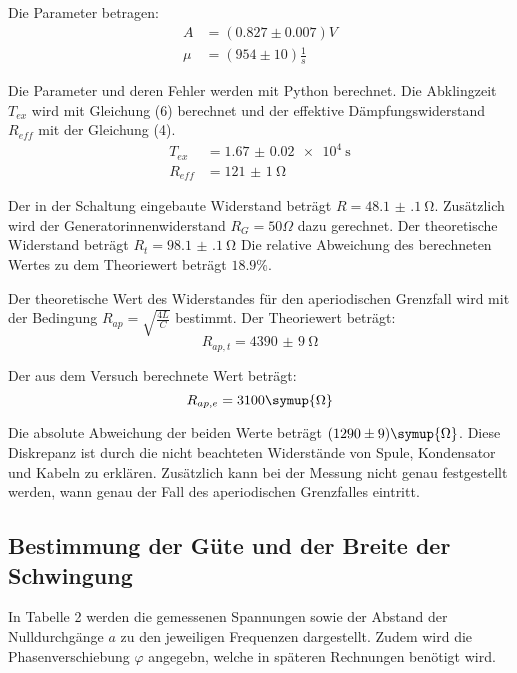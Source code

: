 Die Parameter betragen:
\begin{align*}
  A &= (0.827 \pm 0.007)V \\
  \mu &= (954 \pm 10)\frac{1}{s}
\end{align*}

Die Parameter und deren Fehler werden mit Python berechnet.
Die Abklingzeit $T_{ex}$ wird mit Gleichung (6) berechnet und der effektive Dämpfungswiderstand $R_{eff}$ mit
der Gleichung (4).
\begin{align*}
T_{ex} &= \SI{1.67(2)e4}{\second} \\
R_{eff} &= \SI{121(1)}{\ohm}
\end{align*}

Der in der Schaltung eingebaute Widerstand beträgt $R = \SI{48.1(1)}{\ohm}$. Zusätzlich wird der
Generatorinnenwiderstand $R_G = 50 \Omega$ dazu gerechnet. Der theoretische Widerstand beträgt $R_t = \SI{98.1(1)}{\ohm}$
Die relative Abweichung des berechneten Wertes zu dem Theoriewert beträgt $18.9\%$.


Der theoretische Wert des Widerstandes für den aperiodischen Grenzfall wird mit der Bedingung
$R_{ap} =\sqrt{\frac{4L}{C}}$ bestimmt. Der Theoriewert beträgt:
\begin{equation*}
  R_{ap,t} = \SI{4390(9)}{\ohm}
\end{equation*}

Der aus dem Versuch berechnete Wert beträgt:
\begin{equation*}
  R_{ap,e} = 3100 \symup{\Omega}
\end{equation*}

Die absolute Abweichung der beiden Werte beträgt $(1290 \pm 9) \symup{\Omega}$.
Diese Diskrepanz ist durch die nicht beachteten Widerstände von Spule, Kondensator und Kabeln zu erklären. Zusätzlich
kann bei der Messung nicht genau festgestellt werden, wann genau der Fall des aperiodischen Grenzfalles eintritt.


\subsection{Bestimmung der Güte und der Breite der Schwingung}

In Tabelle 2 werden die gemessenen Spannungen sowie der Abstand der Nulldurchgänge $a$ zu den jeweiligen
Frequenzen dargestellt. Zudem wird die Phasenverschiebung $\varphi$ angegebn, welche in späteren Rechnungen
benötigt wird.

